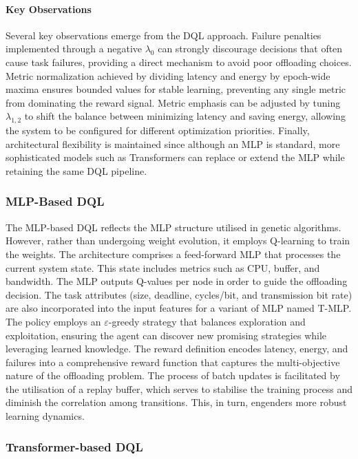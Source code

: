\documentclass[preprint,3p,authoryear]{elsarticle}
\begin{document}
\paragraph{Key Observations}
Several key observations emerge from the DQL approach. Failure penalties implemented through a negative \(\lambda_{0}\) can strongly discourage decisions that often cause task failures, providing a direct mechanism to avoid poor offloading choices. Metric normalization achieved by dividing latency and energy by epoch-wide maxima ensures bounded values for stable learning, preventing any single metric from dominating the reward signal. Metric emphasis can be adjusted by tuning \(\lambda_{1,2}\) to shift the balance between minimizing latency and saving energy, allowing the system to be configured for different optimization priorities. Finally, architectural flexibility is maintained since although an MLP is standard, more sophisticated models such as Transformers can replace or extend the MLP while retaining the same DQL pipeline.

\subsubsection{MLP-Based DQL}\label{subsubsec:mlp_DQL}

The MLP-based DQL reflects the MLP structure utilised in genetic algorithms. However, rather than undergoing weight evolution, it employs Q-learning to train the weights. The architecture comprises a feed-forward MLP that processes the current system state. This state includes metrics such as CPU, buffer, and bandwidth. The MLP outputs Q-values per node in order to guide the offloading decision. The task attributes (size, deadline, cycles/bit, and transmission bit rate) are also incorporated into the input features for a variant of MLP named T-MLP. The policy employs an \(\varepsilon\)-greedy strategy that balances exploration and exploitation, ensuring the agent can discover new promising strategies while leveraging learned knowledge. The reward definition encodes latency, energy, and failures into a comprehensive reward function that captures the multi-objective nature of the offloading problem. The process of batch updates is facilitated by the utilisation of a replay buffer, which serves to stabilise the training process and diminish the correlation among transitions. This, in turn, engenders more robust learning dynamics.


\subsubsection{Transformer-based DQL}\label{subsubsec:transformers}
\end{document}
